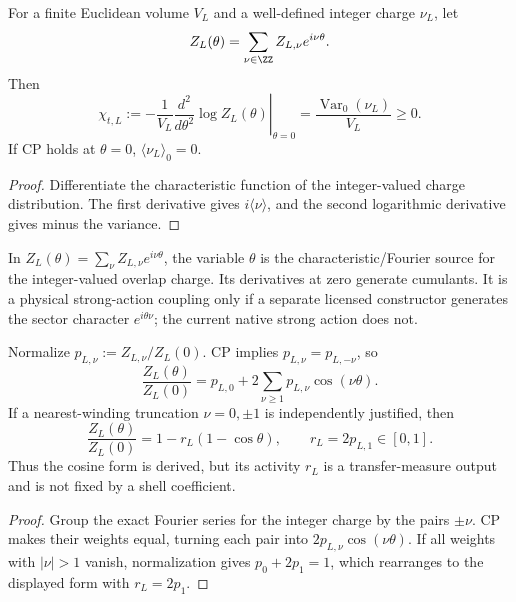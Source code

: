 \documentclass[12pt,a4paper]{article}
\begin{document}
\begin{theorem}
\label{p10:thm:native-topological-susceptibility-transfer-curvature}
For a finite Euclidean volume \(V_L\) and a well-defined integer charge \(\nu_L\), let
\begin{equation}
Z_L(\theta)=\sum_{\nu\in\ZZ} Z_{L,\nu}e^{i\nu\theta}.
\end{equation}
Then
\begin{equation}
\label{p10:eq:topological-susceptibility-variance}
\chi_{t,L}:=-\frac1{V_L}\left.\frac{d^2}{d\theta^2}\log Z_L(\theta)\right|_{\theta=0}
=\frac{\operatorname{Var}_{0}(\nu_L)}{V_L}\ge0.
\end{equation}
If CP holds at \(\theta=0\), \(\langle\nu_L\rangle_0=0\).
\end{theorem}
\begin{proof}
Differentiate the characteristic function of the integer-valued charge distribution.  The first derivative gives \(i\langle\nu\rangle\), and the second logarithmic derivative gives minus the variance.
\end{proof}

\begin{remark}
\label{p10:rem:v161-theta-fourier-source}
In \(Z_L(\theta)=\sum_\nu Z_{L,\nu}e^{i\nu\theta}\), the variable \(\theta\)
is the characteristic/Fourier source for the integer-valued overlap charge.
Its derivatives at zero generate cumulants.  It is a physical strong-action
coupling only if a separate licensed constructor generates the sector
character \(e^{i\theta\nu}\); the current native strong action does not.
\end{remark}

\begin{theorem}
\label{p10:thm:primitive-unit-winding-theta-transfer-form}
Normalize \(p_{L,\nu}:=Z_{L,\nu}/Z_L(0)\).  CP implies \(p_{L,\nu}=p_{L,-\nu}\), so
\begin{equation}
\frac{Z_L(\theta)}{Z_L(0)}=p_{L,0}+2\sum_{\nu\ge1}p_{L,\nu}\cos(\nu\theta).
\end{equation}
If a nearest-winding truncation \(\nu=0,\pm1\) is independently justified, then
\begin{equation}
\frac{Z_L(\theta)}{Z_L(0)}=1-r_L(1-\cos\theta),\qquad r_L=2p_{L,1}\in[0,1].
\end{equation}
Thus the cosine form is derived, but its activity \(r_L\) is a transfer-measure output and is not fixed by a shell coefficient.
\end{theorem}
\begin{proof}
Group the exact Fourier series for the integer charge by the pairs $\pm\nu$.  CP makes their weights equal, turning each pair into $2p_{L,\nu}\cos(\nu\theta)$.  If all weights with $|\nu|>1$ vanish, normalization gives $p_0+2p_1=1$, which rearranges to the displayed form with $r_L=2p_1$.
\end{proof}
\end{document}
